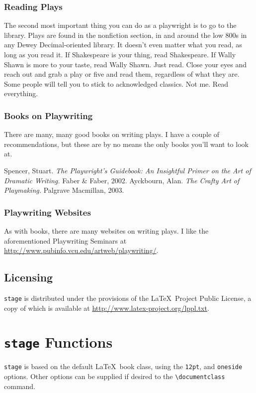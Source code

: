 \documentclass{report}
\begin{document}
\subsection{Reading Plays}
The second most important thing you can do as a playwright is to go to the library. Plays are found in the nonfiction section, in and around the low 800s in any Dewey Decimal-oriented library. It doesn’t even matter what you read, as long as you read it. If Shakespeare is your thing, read Shakespeare. If Wally Shawn is more to your taste, read Wally Shawn. Just read. Close your eyes and reach out and grab a play or five and read them, regardless of what they are. Some people will tell you to stick to acknowledged classics. Not me. Read everything.

\subsection{Books on Playwriting}

There are many, many good books on writing plays. I have a couple of recommendations, but these are by no means the only books you’ll want to look at.

Spencer, Stuart. \emph{The Playwright’s Guidebook: An Insightful Primer on the Art of Dramatic Writing.} Faber \& Faber, 2002. Ayckbourn, Alan. \emph{The Crafty Art of Playmaking.} Palgrave Macmillan, 2003.

\subsection{Playwriting Websites}
As with books, there are many websites on writing plays. I like the aforementioned Playwriting Seminars at \url{http://www.pubinfo.vcu.edu/artweb/playwriting/}.

\section{Licensing}

\texttt{stage} is distributed under the provisions of the \LaTeX\ Project Public License, a copy of which is available at \url{http://www.latex-project.org/lppl.txt}.

\chapter{\texttt{stage} Functions}

\texttt{stage} is based on the default \LaTeX\ book class, using the \texttt{12pt}, and \texttt{oneside} options. Other options can be supplied if desired to the \verb|\documentclass| command.
\end{document}

